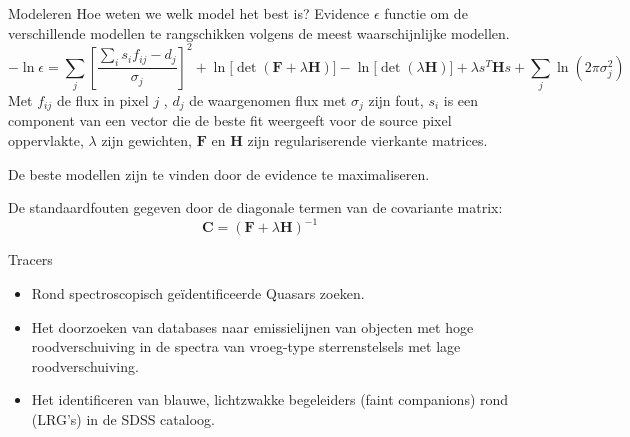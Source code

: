 \documentclass[aspectratio=169,xcolor=dvipsnames]{beamer}
\begin{document}
\begin{frame}{Modeleren}
    Hoe weten we welk model het best is?
    Evidence \(\epsilon\) functie om de verschillende modellen te rangschikken volgens de meest waarschijnlijke modellen.
    \[
    -\ln \epsilon = \sum_j \left[\frac{\sum_i s_i f_{ij} - d_j}{\sigma_j}\right]^2
    + \ln\!\bigl[\det(\bm F + \lambda  \bm H)\bigr]
    - \ln\!\bigl[\det(\lambda \bm H)\bigr]
    + \lambda s^{T} \bm H s
    + \sum_j \ln\!\left(2\pi \sigma_j^2\right)
    \]
    Met \(f_{ij}\) de flux in pixel \(j\) , \(d_j\) de waargenomen flux met \(\sigma_j\) zijn fout,  \(s_i\) is een component van een vector die de beste fit weergeeft voor de source pixel oppervlakte, \(\lambda\) zijn gewichten, \(\bm F\) en \(\bm H\) zijn regulariserende vierkante matrices.

    De beste modellen zijn te vinden door de evidence te maximaliseren.

    De standaardfouten gegeven door de diagonale termen van de covariante matrix:
    \[
    \bm C = (\bm F + \lambda \bm H)^{-1}
    \]

\end{frame}


\begin{frame}{Tracers}
\begin{itemize}
    \item Rond spectroscopisch geïdentificeerde Quasars zoeken.
    \item Het doorzoeken van databases naar emissielijnen van objecten met hoge roodverschuiving in de spectra van vroeg-type sterrenstelsels met lage roodverschuiving.
    \item Het identificeren van blauwe, lichtzwakke begeleiders (faint companions) rond (LRG's) in de SDSS cataloog.
\end{itemize}

\end{frame}
\end{document}
